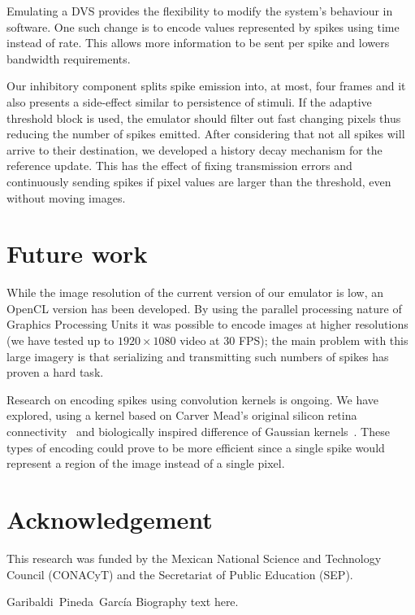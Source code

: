 \documentclass[conference]{IEEEtran}
\begin{document}
Emulating a DVS provides the flexibility to modify the system's behaviour in software. One such change is to encode values represented by spikes using time instead of rate. This allows more information to be sent per spike and lowers bandwidth requirements. 

Our inhibitory component splits spike emission into, at most, four frames and it also presents a side-effect similar to persistence of stimuli. If the adaptive threshold block is used, the emulator should filter out fast changing pixels thus reducing the number of spikes emitted. After considering that not all spikes will arrive to their destination, we developed a history decay mechanism for the reference update. This has the effect of fixing transmission errors and continuously sending spikes if pixel values are larger than the threshold, even without moving images.

\section{Future work}
\label{sec:future-work}
While the image resolution of the current version of our emulator is low, an OpenCL version has been developed. By using the parallel processing nature of Graphics Processing Units it was possible to encode images at higher resolutions (we have tested up to $1920\times1080$ video at 30 FPS); the main problem with this large imagery is that serializing and transmitting such numbers of spikes has proven a hard task.

Research on encoding spikes using convolution kernels is ongoing. We have explored, using a kernel based on Carver Mead's original silicon retina connectivity~\cite{Mead1989} and biologically inspired difference of Gaussian kernels~\cite{basab}. These types of encoding could prove to be more efficient since a single spike would represent a region of the image instead of a single pixel.
\section*{Acknowledgement}

This research was funded by the Mexican National Science and Technology Council (CONACyT) and the Secretariat of Public Education (SEP).






\begin{IEEEbiography}{Garibaldi~Pineda~García}
  Biography text here.
\end{IEEEbiography}
\end{document}

